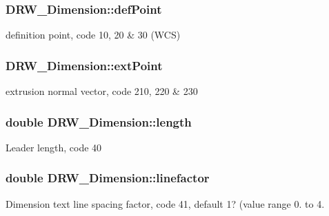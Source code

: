 \subsubsection[{def\+Point}]{ D\+R\+W\+\_\+\+Dimension\+::def\+Point\hspace{0.3cm}{\ttfamily [private]}}\label{class_d_r_w___dimension_a1f00cdbce7d5d7139578ded6fe44f336}
definition point, code 10, 20 \& 30 (W\+C\+S) \hypertarget{class_d_r_w___dimension_a205674ec560ace6c57f14332a8992e2d}{}
\subsubsection[{ext\+Point}]{ D\+R\+W\+\_\+\+Dimension\+::ext\+Point\hspace{0.3cm}{\ttfamily [private]}}\label{class_d_r_w___dimension_a205674ec560ace6c57f14332a8992e2d}
extrusion normal vector, code 210, 220 \& 230 \hypertarget{class_d_r_w___dimension_accab6e5384d68c63b458d364fa9bf0e3}{}
\subsubsection[{length}]{\setlength{\rightskip}{0pt plus 5cm}double D\+R\+W\+\_\+\+Dimension\+::length\hspace{0.3cm}{\ttfamily [private]}}\label{class_d_r_w___dimension_accab6e5384d68c63b458d364fa9bf0e3}
Leader length, code 40 \hypertarget{class_d_r_w___dimension_a629153fb6c846e1b2d8dabf6e32956d1}{}
\subsubsection[{linefactor}]{\setlength{\rightskip}{0pt plus 5cm}double D\+R\+W\+\_\+\+Dimension\+::linefactor\hspace{0.3cm}{\ttfamily [private]}}\label{class_d_r_w___dimension_a629153fb6c846e1b2d8dabf6e32956d1}
Dimension text line spacing factor, code 41, default 1? (value range 0. to 4. \hypertarget{class_d_r_w___dimension_a3915235284c71e9e87ec6c4c18b95449}{}
